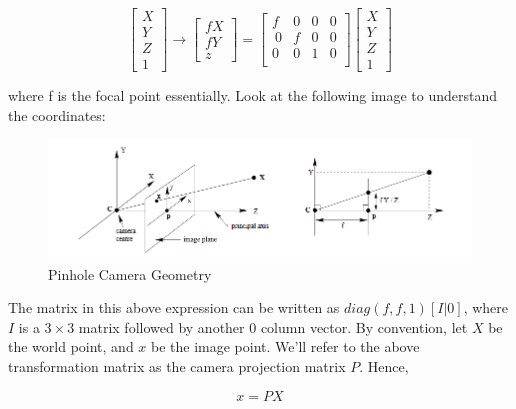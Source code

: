 \begin{equation*}
    \begin{bmatrix}
    X \\
    Y \\
    Z \\
    1
    \end{bmatrix}\longrightarrow \begin{bmatrix}
    fX \\
    fY \\
    z
    \end{bmatrix} = \begin{bmatrix}
    f & 0 & 0 & 0 \\\
    0 & f & 0 & 0 \\
    0 & 0 & 1 & 0 \\
    \end{bmatrix} \begin{bmatrix}
    X \\
    Y \\
    Z \\
    1
    \end{bmatrix}
\end{equation*}

where f is the focal point essentially. Look at the following image to understand the coordinates:

\clearpage

\begin{figure}[t]
    \centering
    \includegraphics[width=12cm]{img/pinholecamerageometry.png}
    \caption{Pinhole Camera Geometry}
    \label{fig:pinhole-cam-geo}
\end{figure}

The matrix in this above expression can be written as $diag(f,f,1)[I|0]$, where $I$ is a $3\times3$ matrix followed by another $0$ column vector. By convention, let $X$ be the world point, and $x$ be the image point. We'll refer to the above transformation matrix as the camera projection matrix $P$. Hence,

\begin{equation}
    x = PX
\end{equation}

